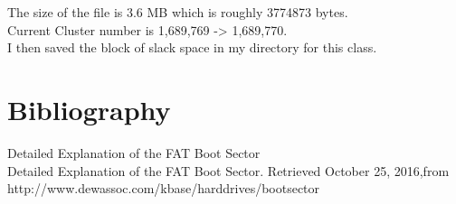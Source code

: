 \documentclass[12ptletterpaper]{paper}
\newcommand\tab[1][1cm]{\hspace*{#1}}
\begin{document}
\begin{flushleft}
		\tab The size of the file is 3.6 MB which is roughly 3774873 bytes.\\
		\tab Current Cluster number is 1,689,769 -> 1,689,770.\\
		\tab I then saved the block of slack space in my directory for this class.\\
		
		\pagebreak
		\section{Bibliography}
		
		\noindent\hypertarget{Detailed Explanation of the FAT Boot Sector}{Detailed Explanation of the FAT Boot Sector\\Detailed Explanation of the FAT Boot Sector. Retrieved October 25, 2016,from http://www.dewassoc.com/kbase/harddrives/bootsector} \vspace{12pt}		
		
		
	\end{flushleft}
\end{document}
